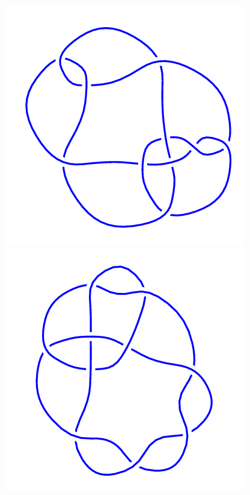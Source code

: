 \begin{figure}[H]
\begin{minipage}[b]{.18\linewidth}
	\end{minipage}
	\begin{minipage}[b]{.18\linewidth}
		\centering
		\includegraphics[width=\linewidth]{../data/10_84.png}
	\end{minipage}
	\begin{minipage}[b]{.18\linewidth}
		\centering
		\includegraphics[width=\linewidth]{../data/10_85.png}

\end{minipage}
\end{figure}
